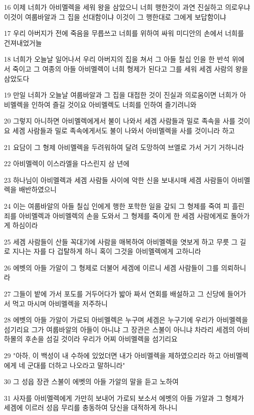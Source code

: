 \par 16 이제 너희가 아비멜렉을 세워 왕을 삼았으니 너희 행한것이 과연 진실하고 의로우냐 이것이 여룹바알과 그 집을 선대함이냐 이것이 그 행한대로 그에게 보답함이냐
\par 17 우리 아버지가 전에 죽음을 무릅쓰고 너희를 위하여 싸워 미디안의 손에서 너희를 건져내었거늘
\par 18 너희가 오늘날 일어나서 우리 아버지의 집을 쳐서 그 아들 칠십 인을 한 반석 위에서 죽이고 그 여종의 아들 아비멜렉이 너희 형제가 된다고 그를 세워 세겜 사람의 왕을 삼았도다
\par 19 만일 너희가 오늘날 여룹바알과 그 집을 대접한 것이 진실과 의로움이면 너희가 아비멜렉을 인하여 즐길 것이요 아비멜렉도 너희를 인하여 즐기려니와
\par 20 그렇지 아니하면 아비멜렉에게서 불이 나와서 세겜 사람들과 밀로 족속을 사를 것이요 세겜 사람들과 밀로 족속에게서도 불이 나와서 아비멜렉을 사를 것이니라 하고
\par 21 요담이 그 형제 아비멜렉을 두려워하여 달려 도망하여 브엘로 가서 거기 거하니라
\par 22 아비멜렉이 이스라엘을 다스린지 삼 년에
\par 23 하나님이 아비멜렉과 세겜 사람들 사이에 악한 신을 보내시매 세겜 사람들이 아비멜렉을 배반하였으니
\par 24 이는 여룹바알의 아들 칠십 인에게 행한 포학한 일을 갚되 그 형제를 죽여 피 흘린 죄를 아비멜렉과 아비멜렉의 손을 도와서 그 형제를 죽이게 한 세겜 사람에게로 돌아가게 하심이라
\par 25 세겜 사람들이 산들 꼭대기에 사람을 매복하여 아비멜렉을 엿보게 하고 무릇 그 길로 지나는 자를 다 겁탈하게 하니 혹이 그것을 아비멜렉에게 고하니라
\par 26 에벳의 아들 가알이 그 형제로 더불어 세겜에 이르니 세겜 사람들이 그를 의뢰하니라
\par 27 그들이 밭에 가서 포도를 거두어다가 밟아 짜서 연회를 배설하고 그 신당에 들어가서 먹고 마시며 아비멜렉을 저주하니
\par 28 에벳의 아들 가알이 가로되 아비멜렉은 누구며 세겜은 누구기에 우리가 아비멜렉을 섬기리요 그가 여룹바알의 아들이 아니냐 그 장관은 스불이 아니냐 차라리 세겜의 아비 하몰의 후손을 섬길 것이라 우리가 어찌 아비멜렉을 섬기리요
\par 29 "아하, 이 백성이 내 수하에 있었더면 내가 아비멜렉을 제하였으리라 하고 아비멜렉에게 네 군대를 더하고 나오라고 말하니라"
\par 30 그 성읍 장관 스불이 에벳의 아들 가알의 말을 듣고 노하여
\par 31 사자를 아비멜렉에게 가만히 보내어 가로되 보소서 에벳의 아들 가알과 그 형제가 세겜에 이르러 성읍 무리를 충동하여 당신을 대적하게 하나니
